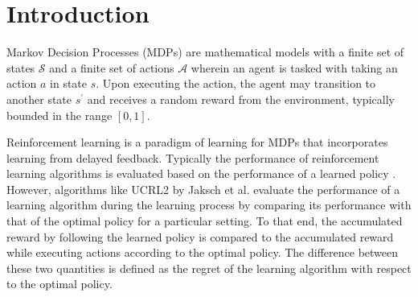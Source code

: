 \normallinespacing

\chapter{Introduction}

Markov Decision Processes (MDPs) are mathematical models with a finite set of states $\mathcal{S}$ and a finite set of actions $\mathcal{A}$ wherein an agent is tasked with taking an action $a$ in state $s$.
Upon executing the action, the agent may transition to another state $s^\prime$ and receives a random reward from the environment, typically bounded in the range $[0, 1]$.

Reinforcement learning is a paradigm of learning for MDPs that incorporates learning from delayed feedback.
Typically the performance of reinforcement learning algorithms is evaluated based on the performance of a learned policy \cite{sutton_reinforcement_2018, kearns_finite-sample_1999}.
However, algorithms like UCRL2 \cite{jaksch_near-optimal_2010} by Jaksch et al. evaluate the performance of a learning algorithm during the learning process by comparing its performance with that of the optimal policy for a particular setting.
To that end, the accumulated reward by following the learned policy is compared to the accumulated reward while executing actions according to the optimal policy.
The difference between these two quantities is defined as the regret of the learning algorithm with respect to the optimal policy.

